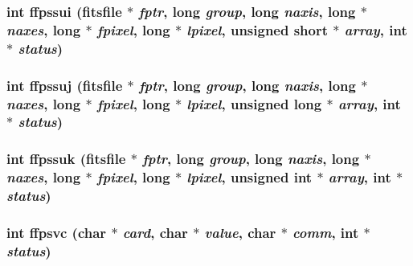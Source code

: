 \subsubsection{\setlength{\rightskip}{0pt plus 5cm}int ffpssui (\bf{fitsfile} $\ast$ {\em fptr}, long {\em group}, long {\em naxis}, long $\ast$ {\em naxes}, long $\ast$ {\em fpixel}, long $\ast$ {\em lpixel}, unsigned short $\ast$ {\em array}, int $\ast$ {\em status})}\label{test_2shm__client_2fitsio_8h_f72bb4b9e6bf54650b3442d4fe08e50a}


\subsubsection{\setlength{\rightskip}{0pt plus 5cm}int ffpssuj (\bf{fitsfile} $\ast$ {\em fptr}, long {\em group}, long {\em naxis}, long $\ast$ {\em naxes}, long $\ast$ {\em fpixel}, long $\ast$ {\em lpixel}, unsigned long $\ast$ {\em array}, int $\ast$ {\em status})}\label{test_2shm__client_2fitsio_8h_59750e86feb6356e01a6ce684dad31d1}


\subsubsection{\setlength{\rightskip}{0pt plus 5cm}int ffpssuk (\bf{fitsfile} $\ast$ {\em fptr}, long {\em group}, long {\em naxis}, long $\ast$ {\em naxes}, long $\ast$ {\em fpixel}, long $\ast$ {\em lpixel}, unsigned int $\ast$ {\em array}, int $\ast$ {\em status})}\label{test_2shm__client_2fitsio_8h_6211df3aa144d88cda8fd8fe8eade594}


\subsubsection{\setlength{\rightskip}{0pt plus 5cm}int ffpsvc (char $\ast$ {\em card}, char $\ast$ {\em value}, char $\ast$ {\em comm}, int $\ast$ {\em status})}\label{test_2shm__client_2fitsio_8h_9a1a8933359feb3576cc14a1e5c671c5}



